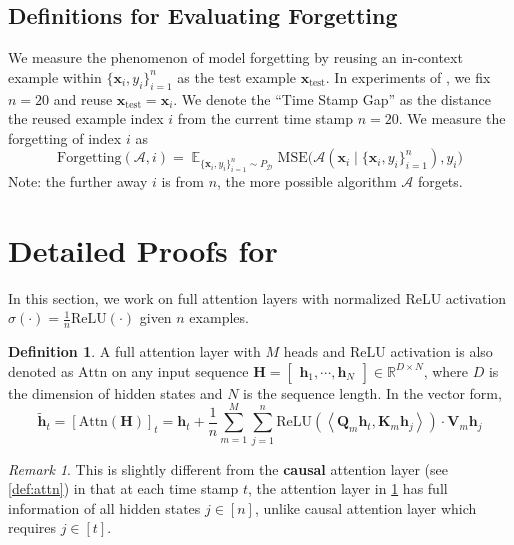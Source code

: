 \documentclass[11pt]{article}
\theoremstyle{plain}
\theoremstyle{definition}
\newtheorem{definition}[theorem]{Definition}
\theoremstyle{remark}
\newtheorem{remark}[theorem]{Remark}
\newcommand{\calA}{{\mathcal{A}}}
\renewcommand{\^}[1]{^{(#1)}}
\newcommand{\bx}{\boldsymbol{x}}
\newcommand{\bh}{\boldsymbol{h}}
\newcommand{\bK}{\boldsymbol{K}}
\newcommand{\bH}{\boldsymbol{H}}
\newcommand{\bQ}{\boldsymbol{Q}}
\newcommand{\bV}{\boldsymbol{V}}
\newcommand{\inner}[1]{ \left\langle {#1} \right\rangle }
\begin{document}
\subsection{Definitions for Evaluating Forgetting} \label{ssec:forgetting}
We measure the phenomenon of model forgetting by reusing an in-context example within $\{\bx_i, y_i\}_{i=1}^n$ as the test example $\bx_\mathrm{test}$. In experiments of , we fix $n = 20$ and reuse $\bx_\mathrm{test} = \bx_i$. We denote the ``Time Stamp Gap'' as the distance the reused example index $i$ from the current time stamp $n = 20$. We measure the forgetting of index $i$ as 
\begin{equation}
   \mathrm{Forgetting}(\calA, i) = \mathop{\mathbb E}_{\{\bx_i, y_i\}_{i=1}^n \sim P_{\mathcal{D}}} \mathrm{MSE}\Big(\mathcal A(\bx_i \mid \{\bx_i, y_i\}_{i=1}^n), y_i\Big)
\end{equation}
Note: the further away $i$ is from $n$, the more possible algorithm $\calA$ forgets.

\clearpage
\section{Detailed Proofs for  } \label{app:mechanism}
In this section, we work on full attention layers with normalized ReLU activation $\sigma(\cdot) = \frac{1}{n} \mathrm{ReLU}(\cdot)$ given $n$ examples. 
\begin{definition}
\label{def:attn_full_relu}
    A full attention layer with $M$ heads and ReLU activation is also denoted as $\mathrm{Attn}$ on any input sequence $\bH = \begin{bmatrix}
        \bh_1, \cdots, \bh_N
    \end{bmatrix} \in \mathbb R^{D \times N}$, where $D$ is the dimension of hidden states and $N$ is the sequence length. In the vector form,
    \begin{equation}
         \tilde{\bh}_t = [\mathrm{Attn}(\bH)]_t = \bh_t +  \frac{1}{n} \sum_{m=1}^M \sum_{j=1}^n \mathrm{ReLU} \left(\inner{\bQ_m \bh_t, \bK_m \bh_j}\right) \cdot \bV_m \bh_j
    \end{equation}
\end{definition}
\begin{remark}
    This is slightly different from the \textbf{causal} attention layer (see \cref{def:attn}) in that at each time stamp $t$, the attention layer in \cref{def:attn_full_relu} has full information of all hidden states $j \in [n]$, unlike causal attention layer which requires $j \in [t]$. 
\end{remark}
\end{document}
